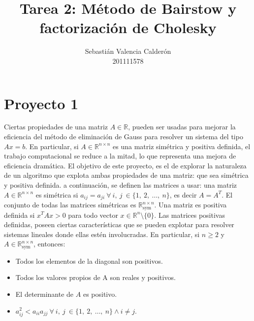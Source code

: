 \documentclass[11pt, spanish]{article}
\date{}
\begin{document}
\renewcommand\lstlistlistingname{Lista de Scripts}

\author{Sebastián Valencia Calderón \\ 201111578}
\title{Tarea 2: Método de Bairstow y factorización de Cholesky}
\maketitle


\section{Proyecto 1}

Ciertas propiedades de una matriz $A \in \mathbb{R}$, pueden ser usadas para mejorar la eficiencia del método de eliminación de Gauss para resolver un sistema del tipo $Ax = b$. En particular, si $A \in \mathbb{R}^{n \times n}$ es una matriz simétrica y positiva definida, el trabajo computacional se reduce a la mitad, lo que representa una mejora de eficiencia dramática. El objetivo de este proyecto, es el de explorar la naturaleza de un algoritmo que explota ambas propiedades de una matriz: que sea simétrica y positiva definida. a continuación, se definen las matrices a usar: una matriz $A \in \mathbb{R}^{n \times n}$ es simétrica si $a_{ij} = a_{ji}\ \forall\ i,\ j\ \in \{1,\ 2,\ \dots,\ n\}$, es decir $A = A^T$. El conjunto de todas las matrices simétricas es $\mathbb{R}_{\text{sym}}^{n \times n}$. Una matriz es positiva definida si $x^TAx > 0$ para todo vector $x \in \mathbb{R}^n \setminus \{ 0\}$. Las matrices positivas definidas, poseen ciertas características que se pueden explotar para resolver sistemas lineales donde ellas estén involucradas. En particular, si $n \geq 2$ y $A \in \mathbb{R}_{\text{sym}}^{n \times n}$, entonces:

\begin{itemize}
\item Todos los elementos de la diagonal son positivos.

\item Todos los valores propios de A son reales y positivos.

\item El determinante de $A$ es positivo.

\item $a_{ij}^2 < a_{ii}a_{jj}\ \forall\ i,\ j\ \in \{1,\ 2,\ \dots,\ n\} \wedge i \neq j$.
\end{itemize}
\end{document}
